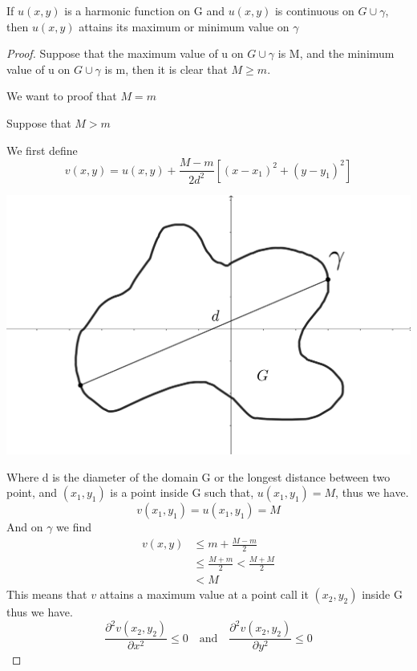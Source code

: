 \documentclass[]{article}
\begin{document}
\begin{theorem}
    If $u(x,y)$ is a harmonic function on G and $u(x,y)$ is continuous on $G \cup \gamma$, then $u(x,y)$ attains its maximum or minimum value on $\gamma$    
\end{theorem}
\begin{proof}
    Suppose that the maximum value of u on $G \cup \gamma$ is M, and the minimum value of u on $G \cup \gamma$ is m, then it is clear that $M \geq m$.
    \par
    We want to proof that $M = m$ 
    \par
    Suppose that $M > m$ 
    \par
    We first define
    \[
        v(x,y) = u(x,y) + \frac{M-m}{2d^2}\left[(x-x_{1})^2+(y-y_{1})^2\right]    
    \]
    \begin{center}
        \includegraphics[scale=0.1]{diameter.png}
    \end{center}
    Where d is the diameter of the domain G or the longest distance between two point, 
    and $(x_1,y_1)$ is a point inside G such that, $u(x_1,y_1) = M$, thus we have.
    \[
        v(x_1,y_1) = u(x_1,y_1) = M    
    \]
    And on $\gamma$ we find
    \begin{align*}
        v(x,y) &\leq m+\frac{M-m}{2}
        \\
        &\leq \frac{M+m}{2} < \frac{M+M}{2}
        \\
        &< M
    \end{align*}
    This means that $v$ attains a maximum value at a point call it $(x_2,y_2)$ inside G thus we have.
    \[
        \frac{\partial^2 v(x_2,y_2)}{\partial x^2} \leq 0 \quad \text{and} \quad \frac{\partial^2 v(x_2,y_2)}{\partial y^2} \leq 0    
\]
\end{proof}
\end{document}

